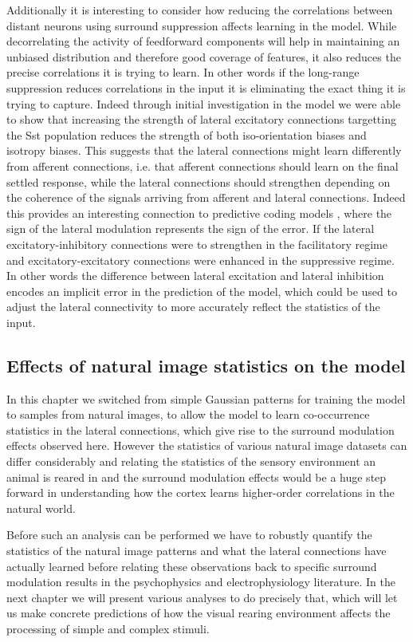 Additionally it is interesting to consider how reducing the
correlations between distant neurons using surround suppression
affects learning in the model. While decorrelating the activity of
feedforward components will help in maintaining an unbiased
distribution and therefore good coverage of features, it also reduces
the precise correlations it is trying to learn. In other words if the
long-range suppression reduces correlations in the input it is
eliminating the exact thing it is trying to capture. Indeed through
initial investigation in the model we were able to show that
increasing the strength of lateral excitatory connections targetting
the Sst population reduces the strength of both iso-orientation biases
and isotropy biases. This suggests that the lateral connections might
learn differently from afferent connections, i.e. that afferent
connections should learn on the final settled response, while the
lateral connections should strengthen depending on the coherence of
the signals arriving from afferent and lateral connections. Indeed
this provides an interesting connection to predictive coding models
\citep{Rao1999}, where the sign of the lateral modulation represents
the sign of the error. If the lateral excitatory-inhibitory
connections were to strengthen in the facilitatory regime and
excitatory-excitatory connections were enhanced in the suppressive
regime. In other words the difference between lateral excitation and
lateral inhibition encodes an implicit error in the prediction of the
model, which could be used to adjust the lateral connectivity to more
accurately reflect the statistics of the input.

\subsection{Effects of natural image statistics on the model}

In this chapter we switched from simple Gaussian patterns for training
the model to samples from natural images, to allow the model to learn
co-occurrence statistics in the lateral connections, which give rise
to the surround modulation effects observed here. However the
statistics of various natural image datasets can differ considerably
and relating the statistics of the sensory environment an animal is
reared in and the surround modulation effects would be a huge step
forward in understanding how the cortex learns higher-order
correlations in the natural world.

Before such an analysis can be performed we have to robustly quantify
the statistics of the natural image patterns and what the lateral
connections have actually learned before relating these observations
back to specific surround modulation results in the psychophysics and
electrophysiology literature. In the next chapter we will present
various analyses to do precisely that, which will let us make concrete
predictions of how the visual rearing environment affects the
processing of simple and complex stimuli.
